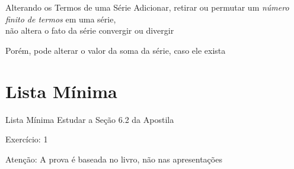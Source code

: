 \begin{frame}{Alterando os Termos de uma Série}
  Adicionar, retirar ou permutar um \emph{número finito de termos} em uma série,\\
  não altera o fato da série convergir ou divergir

  \pause
  \vspace{\baselineskip}
  Porém, pode alterar o valor da soma da série, caso ele exista
\end{frame}

\section{Lista Mínima}

\begin{frame}{Lista Mínima}
  Estudar a Seção 6.2 da Apostila

  \vspace{\baselineskip}
  Exercício: 1

  \vfill
  Atenção: A prova é baseada no livro, não nas apresentações
\end{frame}


